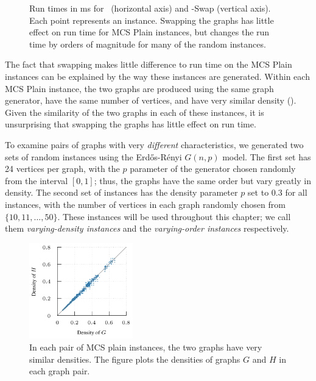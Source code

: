 \begin{figure}[htb]
{        \label{subfig:runtime-swapping-scatter-random3}
    }
    \caption{Run times in ms for \McSplit\ (horizontal axis) and \McSplit-Swap
        (vertical axis).  Each point represents an instance.  Swapping the graphs
        has little effect on run time
        for MCS Plain instances, but changes the run time by orders of magnitude
        for many of the random instances.}\label{figure:runtime-swapping-scatter}
\end{figure}

The fact that swapping makes little difference to run time on the MCS Plain
instances can be explained by the way these instances are generated.  Within
each MCS Plain instance, the two graphs are produced using the same graph
generator, have the same number of vertices, and have very similar density
().  Given the similarity of the two graphs in
each of these instances, it is unsurprising that swapping the graphs has little
effect on run time.

To examine pairs of graphs with very \emph{different} characteristics, we
generated two sets of random instances using the Erd\H{o}s-Rényi $G(n,p)$ model.
The first set has 24 vertices per graph, with the $p$ parameter of the
generator chosen randomly from the interval $[0,1]$; thus, the graphs have the
same order but vary greatly in density.  The second set of instances has the
density parameter $p$ set to $0.3$ for all instances, with the number of
vertices in each graph randomly chosen from $\{10, 11, \dots, 50\}$.  These
instances will be used throughout this chapter; we call them
\emph{varying-density instances} and the \emph{varying-order instances}
respectively.

\begin{figure}[htb]
    \centering
    \includegraphics*[width=0.4\textwidth]{14-mcsplit-i-undirected/modified-mcsplit-experiment/plots/plots/mcsplain-densities}
    \caption{In each pair of MCS plain instances, the two graphs have very similar densities. The figure
        plots the densities of graphs $G$ and $H$ in each graph pair.}
    \label{figure:mcsplain-densities}
\end{figure}

